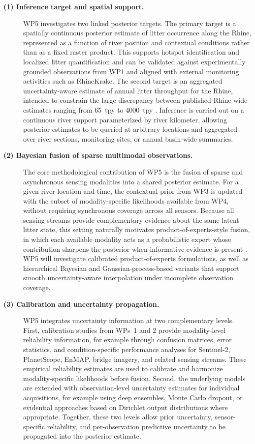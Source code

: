 \documentclass{scrartcl}
\begin{document}
\begin{description}
    \item[\textbf{(1) Inference target and spatial support.}] WP5 investigates two linked posterior targets. The primary target is a spatially continuous posterior estimate of litter occurrence along the Rhine, represented as a function of river position and contextual conditions rather than as a fixed raster product. This supports hotspot identification and localized litter quantification and can be validated against experimentally grounded observations from WP1 and aligned with external monitoring activities such as RhineKrake. The second target is an aggregated uncertainty-aware estimate of annual litter throughput for the Rhine, intended to constrain the large discrepancy between published Rhine-wide estimates ranging from 65~tpy \citep{van2022hydrology} to 4000~tpy \citep{gnann2026river}. Inference is carried out on a continuous river support parameterized by river kilometer, allowing posterior estimates to be queried at arbitrary locations and aggregated over river sections, monitoring sites, or annual basin-wide summaries.

    \item[\textbf{(2) Bayesian fusion of sparse multimodal observations.}] The core methodological contribution of WP5 is the fusion of sparse and asynchronous sensing modalities into a shared posterior estimate. For a given river location and time, the contextual prior from WP3 is updated with the subset of modality-specific likelihoods available from WP4, without requiring synchronous coverage across all sensors. Because all sensing streams provide complementary evidence about the same latent litter state, this setting naturally motivates product-of-experts-style fusion, in which each available modality acts as a probabilistic expert whose contribution sharpens the posterior when informative evidence is present \citep{hinton1999temporal}. WP5 will investigate calibrated product-of-experts formulations, as well as hierarchical Bayesian and Gaussian-process-based variants that support smooth uncertainty-aware interpolation under incomplete observation coverage.

    \item[\textbf{(3) Calibration and uncertainty propagation.}] WP5 integrates uncertainty information at two complementary levels. First, calibration studies from WPs~1 and 2 provide modality-level reliability information, for example through confusion matrices, error statistics, and condition-specific performance analyses for Sentinel-2, PlanetScope, EnMAP, bridge imagery, and related sensing streams. These empirical reliability estimates are used to calibrate and harmonize modality-specific likelihoods before fusion. Second, the underlying models are extended with observation-level uncertainty estimates for individual acquisitions, for example using deep ensembles, Monte Carlo dropout, or evidential approaches based on Dirichlet output distributions where appropriate. Together, these two levels allow prior uncertainty, sensor-specific reliability, and per-observation predictive uncertainty to be propagated into the posterior estimate.


\end{description}
\end{document}
